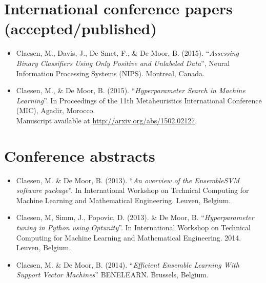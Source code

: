 \section*{International conference papers (accepted/published)}
\begin{itemize}
\item Claesen, M., Davis, J., De Smet, F., \& De Moor, B. (2015). ``\emph{Assessing Binary Classifiers Using Only Positive and Unlabeled Data}'', Neural Information Processing Systems (NIPS). Montreal, Canada.
\item Claesen, M., \& De Moor, B. (2015). ``\emph{Hyperparameter Search in Machine Learning}''. In Proceedings of the 11th Metaheuristics International Conference (MIC), Agadir, Morocco. \\ Manuscript available at \url{http://arxiv.org/abs/1502.02127}.
\end{itemize}

\section*{Conference abstracts}
\begin{itemize}
\item Claesen, M. \& De Moor, B. (2013). ``\emph{An overview of the EnsembleSVM software package}''. In International Workshop on Technical Computing for Machine Learning and Mathematical Engineering. Leuven, Belgium.
\item Claesen, M, Simm, J., Popovic, D. (2013). \& De Moor, B. ``\emph{Hyperparameter tuning in Python using Optunity}''. In International Workshop on Technical Computing for Machine Learning and Mathematical Engineering. 2014. Leuven, Belgium.
\item Claesen, M. \& De Moor, B. (2014). ``\emph{Efficient Ensemble Learning With Support Vector Machines}'' BENELEARN. Brussels, Belgium.
\end{itemize}




